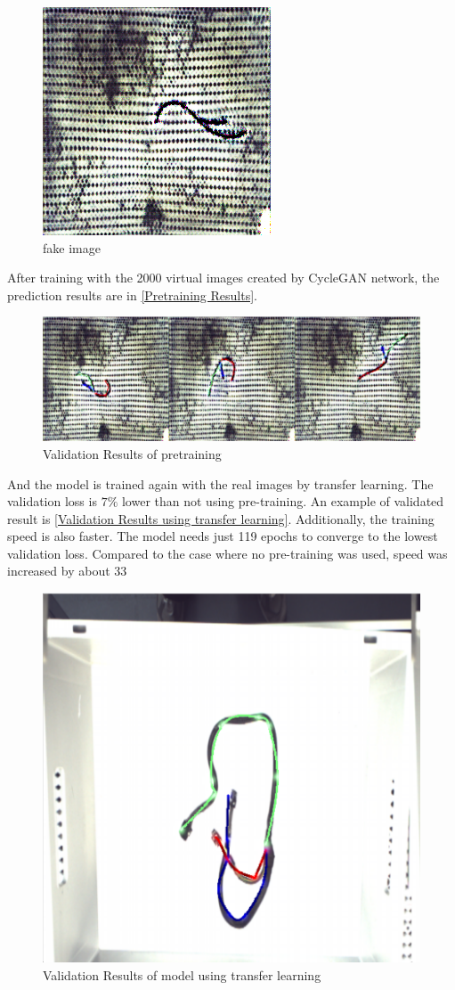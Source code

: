 	\begin{figure}
		\centering
		\includegraphics[width=0.6\linewidth]{example_images/CycleGAN_fakeimage}
		\caption{fake image}
		\label{fig:fakeimage}
	\end{figure}
	After training with the 2000 virtual images created by CycleGAN network, the prediction results are in \autoref{Pretraining Results}.
	\begin{figure}
		\centering
		\includegraphics[width=0.6\linewidth]{example_images/PretrainingResultCycleGAN}
		\caption{Validation Results of pretraining}
		\label{Pretraining Results}
	\end{figure}
	And the model is trained again with the real images by transfer learning. The validation loss is $7\%$ lower than not using pre-training. An example of validated result is 
	\autoref{Validation Results using transfer learning}. Additionally, the training speed is also faster. The model needs just 119 epochs to converge to
	the lowest validation loss. Compared to the case where no pre-training was used, speed was increased by about 33%
	\begin{figure}
		\centering
		\includegraphics[width=0.6\linewidth]{example_images/usePretraining_NoTransformer}
		\caption{Validation Results of model using transfer learning}
		\label{Validation Results using transfer learning}
	\end{figure}

